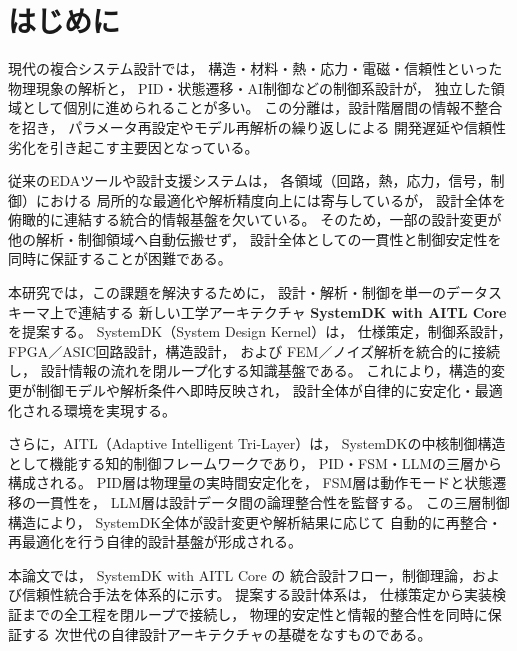 \section{はじめに}

現代の複合システム設計では，
構造・材料・熱・応力・電磁・信頼性といった物理現象の解析と，
PID・状態遷移・AI制御などの制御系設計が，
独立した領域として個別に進められることが多い。
この分離は，設計階層間の情報不整合を招き，
パラメータ再設定やモデル再解析の繰り返しによる
開発遅延や信頼性劣化を引き起こす主要因となっている。

従来のEDAツールや設計支援システムは，
各領域（回路，熱，応力，信号，制御）における
局所的な最適化や解析精度向上には寄与しているが，
設計全体を俯瞰的に連結する統合的情報基盤を欠いている。
そのため，一部の設計変更が他の解析・制御領域へ自動伝搬せず，
設計全体としての一貫性と制御安定性を同時に保証することが困難である。

本研究では，この課題を解決するために，
設計・解析・制御を単一のデータスキーマ上で連結する
新しい工学アーキテクチャ
\textbf{SystemDK with AITL Core} を提案する。
SystemDK（System Design Kernel）は，
仕様策定，制御系設計，FPGA／ASIC回路設計，構造設計，
および FEM／ノイズ解析を統合的に接続し，
設計情報の流れを閉ループ化する知識基盤である。
これにより，構造的変更が制御モデルや解析条件へ即時反映され，
設計全体が自律的に安定化・最適化される環境を実現する。

さらに，AITL（Adaptive Intelligent Tri-Layer）は，
SystemDKの中核制御構造として機能する知的制御フレームワークであり，
PID・FSM・LLMの三層から構成される。
PID層は物理量の実時間安定化を，
FSM層は動作モードと状態遷移の一貫性を，
LLM層は設計データ間の論理整合性を監督する。
この三層制御構造により，
SystemDK全体が設計変更や解析結果に応じて
自動的に再整合・再最適化を行う自律的設計基盤が形成される。

本論文では，
SystemDK with AITL Core の
統合設計フロー，制御理論，および信頼性統合手法を体系的に示す。
提案する設計体系は，
仕様策定から実装検証までの全工程を閉ループで接続し，
物理的安定性と情報的整合性を同時に保証する
次世代の自律設計アーキテクチャの基礎をなすものである。
